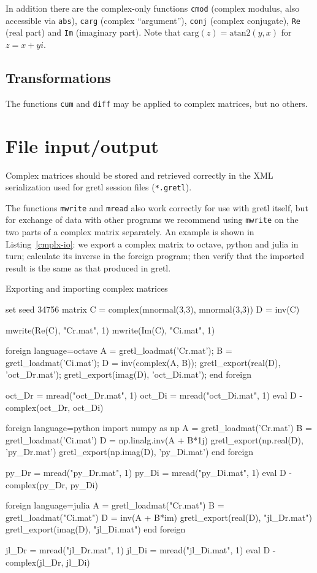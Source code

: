 \documentclass{article}
\begin{document}
In addition there are the complex-only functions \texttt{cmod}
(complex modulus, also accessible via \texttt{abs}), \texttt{carg}
(complex ``argument''), \texttt{conj} (complex conjugate), \texttt{Re}
(real part) and \texttt{Im} (imaginary part). Note that
$\mbox{carg}(z) = \mbox{atan2}(y,x)$ for $z=x + yi$.

\subsection{Transformations}

The functions \texttt{cum} and \texttt{diff} may be applied to complex
matrices, but no others.

\section{File input/output}

Complex matrices should be stored and retrieved correctly in the
XML serialization used for gretl session files (\texttt{*.gretl}).

The functions \texttt{mwrite} and \texttt{mread} also work correctly
for use with gretl itself, but for exchange of data with other
programs we recommend using \texttt{mwrite} on the two parts of a
complex matrix separately. An example is shown in
Listing~\ref{cmplx-io}: we export a complex matrix to \textsf{octave},
\textsf{python} and \textsf{julia} in turn; calculate its inverse in
the foreign program; then verify that the imported result is the same
as that produced in gretl.

\begin{script}[htbp]
  \caption{Exporting and importing complex matrices}
  \label{cmplx-io}
\begin{scode}
set seed 34756
matrix C = complex(mnormal(3,3), mnormal(3,3))
D = inv(C)

mwrite(Re(C), "Cr.mat", 1)
mwrite(Im(C), "Ci.mat", 1)

foreign language=octave
  A = gretl_loadmat('Cr.mat');
  B = gretl_loadmat('Ci.mat');
  D = inv(complex(A, B));
  gretl_export(real(D), 'oct_Dr.mat');
  gretl_export(imag(D), 'oct_Di.mat');
end foreign

oct_Dr = mread("oct_Dr.mat", 1)
oct_Di = mread("oct_Di.mat", 1)
eval D - complex(oct_Dr, oct_Di)

foreign language=python
   import numpy as np
   A = gretl_loadmat('Cr.mat')
   B = gretl_loadmat('Ci.mat')
   D = np.linalg.inv(A + B*1j)
   gretl_export(np.real(D), 'py_Dr.mat')
   gretl_export(np.imag(D), 'py_Di.mat')
end foreign

py_Dr = mread("py_Dr.mat", 1)
py_Di = mread("py_Di.mat", 1)
eval D - complex(py_Dr, py_Di)

foreign language=julia
  A = gretl_loadmat("Cr.mat")
  B = gretl_loadmat("Ci.mat")
  D = inv(A + B*im)
  gretl_export(real(D), "jl_Dr.mat")
  gretl_export(imag(D), "jl_Di.mat")
end foreign

jl_Dr = mread("jl_Dr.mat", 1)
jl_Di = mread("jl_Di.mat", 1)
eval D - complex(jl_Dr, jl_Di)
\end{scode}
\end{script}
\end{document}
